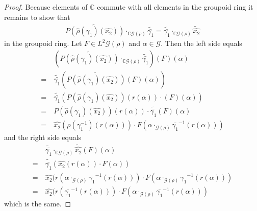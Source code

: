 \documentclass[12pt,a4paper]{scrartcl}
\theoremstyle{plain}
\theoremstyle{definition}
\numberwithin{equation}{section}
\newcommand{\C}{\mathbb{C}} %
\newcommand{\2}{\mathbb{Z} / 2 \mathbb{Z}}
\newcommand{\G}{\mathcal{G}}
\newcommand{\1}{\bar{1}}
\newcommand{\0}{\bar{0}}
\begin{document}
\begin{proof}
	Because elements of $\C$ commute with all elements in the groupoid ring it remains to show that 
	\begin{align*}
		\widetilde{P(\hat{\rho}(\gamma_1)(\hat{x_2}))} \cdot_{\C\G(\rho)} \widetilde{\bar{\gamma_1}} = \widetilde{\bar{\gamma_1}} \cdot_{\C\G(\rho)} \tilde{\hat{x_2}} 
	\end{align*}
	in the groupoid ring.
	Let $F \in L^2 \G(\rho)$ and $\alpha \in \G$. Then the left side equals
	\begin{align*}
		 &~ (\widetilde{P(\hat{\rho}(\gamma_1)(\hat{x_2}))} \cdot_{\C\G(\rho)} \widetilde{\bar{\gamma_1}})(F)(\alpha) \\
		=&~ \widetilde{\bar{\gamma_1}}(\widetilde{P(\hat{\rho}(\gamma_1)(\hat{x_2}))}(F)(\alpha)) \\
		=&~ \widetilde{\bar{\gamma_1}}(P(\hat{\rho}(\gamma_1)(\hat{x_2}))(r(\alpha)) \cdot (F)(\alpha)) \\
		=&~ P(\hat{\rho}(\gamma_1)(\hat{x_2}))(r(\alpha)) \cdot \widetilde{\bar{\gamma_1}}(F)(\alpha) \\
		=&~ \hat{x_2}(\rho (\gamma_1^{-1})( r(\alpha))) \cdot F(\alpha \cdot_{\G (\rho)} \bar{\gamma_1}^{-1}(r(\alpha)))  
	\end{align*}
	and the right side equals
	\begin{align*}
		 &~ \widetilde{\bar{\gamma_1}} \cdot_{\C\G(\rho)} \tilde{\hat{x_2}}(F)(\alpha) \\
		=&~ \widetilde{\bar{\gamma_1}}(\hat{x_2}(r(\alpha)) \cdot F(\alpha)) \\
		=&~ \hat{x_2}(r(\alpha \cdot_{\G (\rho)} \bar{\gamma_1}^{-1}(r(\alpha))) \cdot F(\alpha \cdot_{\G (\rho)} \bar{\gamma_1}^{-1}(r(\alpha))) \\
		=&~ \hat{x_2}(r(\bar{\gamma_1}^{-1}(r(\alpha))) \cdot F(\alpha \cdot_{\G (\rho)} \bar{\gamma_1}^{-1}(r(\alpha)))
	\end{align*}
	which is the same.
	

\end{proof}
\end{document}
